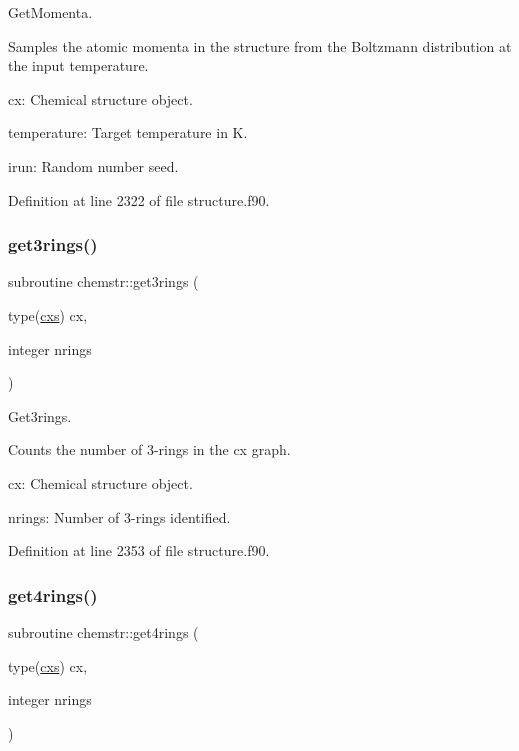 Get\+Momenta. 

Samples the atomic momenta in the structure from the Boltzmann distribution at the input temperature.


\begin{DoxyItemize}
\item cx\+: Chemical structure object.
\item temperature\+: Target temperature in K.
\item irun\+: Random number seed. 
\end{DoxyItemize}

Definition at line 2322 of file structure.\+f90.

\mbox{\label{namespacechemstr_a591122df70e3868553ad901347346998}} 
\subsubsection{\texorpdfstring{get3rings()}{get3rings()}}
{\footnotesize\ttfamily subroutine chemstr\+::get3rings (\begin{DoxyParamCaption}\item[{type(\mbox{\hyperlink{structchemstr_1_1cxs}{cxs}})}]{cx,  }\item[{integer}]{nrings }\end{DoxyParamCaption})}



Get3rings. 

Counts the number of 3-\/rings in the cx graph.


\begin{DoxyItemize}
\item cx\+: Chemical structure object.
\item nrings\+: Number of 3-\/rings identified. 
\end{DoxyItemize}

Definition at line 2353 of file structure.\+f90.

\mbox{\label{namespacechemstr_a82765d5adc1ce177f662c280af854725}} 
\subsubsection{\texorpdfstring{get4rings()}{get4rings()}}
{\footnotesize\ttfamily subroutine chemstr\+::get4rings (\begin{DoxyParamCaption}\item[{type(\mbox{\hyperlink{structchemstr_1_1cxs}{cxs}})}]{cx,  }\item[{integer}]{nrings }\end{DoxyParamCaption})}



